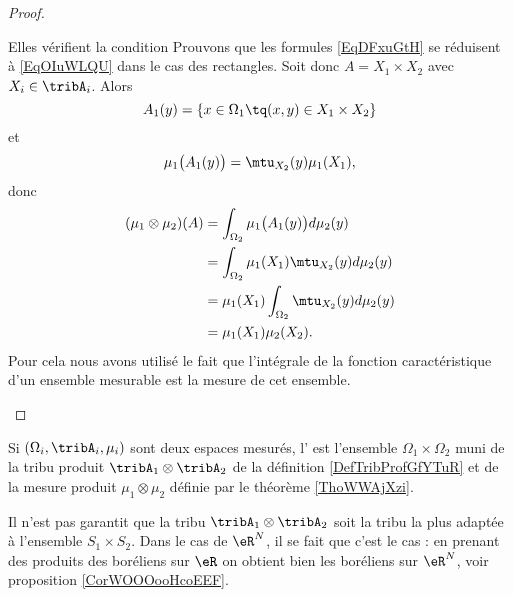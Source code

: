 \begin{proof}
\begin{subproof}
\item[Elles vérifient la condition]
    Prouvons que les formules \eqref{EqDFxuGtH} se réduisent à \eqref{EqOIuWLQU} dans le cas des rectangles. Soit donc \( A=X_1\times X_2\) avec \( X_i\in\tribA_i\). Alors
    \begin{equation}
        A_1(y)=\{ x\in\Omega_1\tq (x,y)\in X_1\times X_2 \}
    \end{equation}
    et
    \begin{equation}
        \mu_1\big( A_1(y) \big)=\mtu_{X_2}(y)\mu_1(X_1),
    \end{equation}
    donc
    \begin{subequations}
        \begin{align}
            (\mu_1\otimes\mu_2)(A)&=\int_{\Omega_2}\mu_1\big( A_1(y) \big)d\mu_2(y)\\
            &=\int_{\Omega_2}\mu_1(X_1)\mtu_{X_2}(y)d\mu_2(y)\\
            &=\mu_1(X_1)\int_{\Omega_2}\mtu_{X_2}(y)d\mu_2(y)\\
            &=\mu_1(X_1)\mu_2(X_2).
        \end{align}
    \end{subequations}
    Pour cela nous avons utilisé le fait que l'intégrale de la fonction caractéristique d'un ensemble mesurable est la mesure de cet ensemble.
    \end{subproof}
\end{proof}

\begin{definition}  \label{DefUMlBCAO}
    Si \( (\Omega_i,\tribA_i,\mu_i)\) sont deux espaces mesurés, l' est l'ensemble \( \Omega_1\times \Omega_2\) muni de la tribu produit \( \tribA_1\otimes \tribA_2\) de la définition \ref{DefTribProfGfYTuR} et de la mesure produit \( \mu_1\otimes \mu_2\) définie par le théorème \ref{ThoWWAjXzi}.
\end{definition}

\begin{remark}
    Il n'est pas garantit que la tribu \( \tribA_1\otimes\tribA_2\) soit la tribu la plus adaptée à l'ensemble \( S_1\times S_2\). Dans le cas de \( \eR^N\), il se fait que c'est le cas : en prenant des produits des boréliens sur \( \eR\) on obtient bien les boréliens sur \( \eR^N\), voir proposition \ref{CorWOOOooHcoEEF}.
\end{remark}


